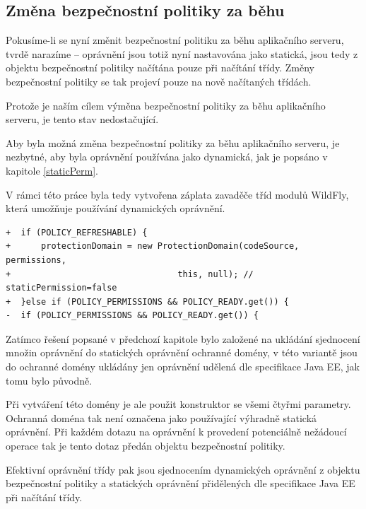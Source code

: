 \subsection{Změna bezpečnostní politiky za běhu} \label{zmenaZaBehu}

Pokusíme-li se nyní změnit bezpečnostní politiku za běhu aplikačního serveru, tvrdě narazíme -- oprávnění jsou totiž nyní nastavována jako statická,
jsou tedy z objektu bezpečnostní politiky načítána pouze při načítání třídy. Změny bezpečnostní politiky se tak projeví pouze na nově načítaných třídách.

Protože je naším cílem výměna bezpečnostní politiky za běhu aplikačního serveru, je tento stav nedostačující.

Aby byla možná změna bezpečnostní politiky za běhu aplikačního serveru, je nezbytné, aby byla oprávnění používána jako dynamická, jak je popsáno v kapitole \ref{staticPerm}.

V rámci této práce byla tedy vytvořena záplata zavaděče tříd modulů WildFly, která umožňuje používání dynamických oprávnění.

\begin{lstlisting}[caption=Hlavní část záplaty umožňující nastavit používání dynamických oprávnění, label=refreshable]
+  if (POLICY_REFRESHABLE) {
+      protectionDomain = new ProtectionDomain(codeSource, permissions,
+                                 this, null); // staticPermission=false
+  }else if (POLICY_PERMISSIONS && POLICY_READY.get()) {
-  if (POLICY_PERMISSIONS && POLICY_READY.get()) {
\end{lstlisting}

Zatímco řešení popsané v předchozí kapitole bylo založené na ukládání sjednocení množin oprávnění do statických oprávnění ochranné domény, v této variantě jsou do ochranné domény ukládány jen oprávnění udělená dle specifikace Java EE, jak tomu bylo původně.

Při vytváření této domény je ale použit konstruktor se všemi čtyřmi parametry. Ochranná doména tak není označena jako používající výhradně statická oprávnění.
Při každém dotazu na oprávnění k provedení potenciálně nežádoucí operace tak je tento dotaz předán objektu bezpečnostní politiky.

Efektivní oprávnění třídy pak jsou sjednocením dynamických oprávnění z objektu bezpečnostní politiky a statických oprávnění přidělených dle specifikace Java EE při načítání třídy.

